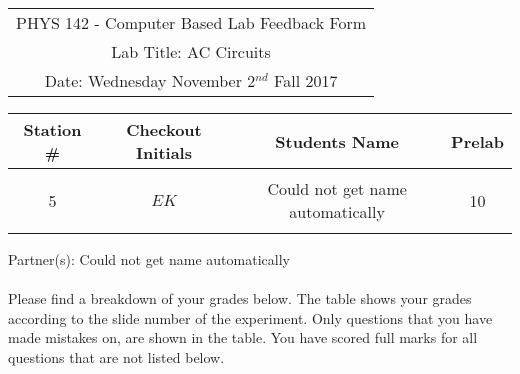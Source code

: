 \documentclass{article}
\begin{document}
\begin{table}[h]
	\centering
	\begin{tabular}{c}
	PHYS 142 - Computer Based Lab Feedback Form\\
	Lab Title: AC Circuits\\Date: Wednesday November 2$^{nd}$ Fall 2017 \\\hline
\end{tabular}
\end{table}
\begin{table}[h]\centering \begin{tabular}{|c|c|p{9.9 cm}|c|}\hline Station \#  & Checkout Initials & \multicolumn{1}{|c|}{Students Name} & Prelab \\\hline\multirow{3}{*}{5}& \multirow{3}{*}{$EK$} & &\\& &\multicolumn{1}{|c|}{Could not get name automatically}&10\\&   &  &\\\hline
\end{tabular}
\end{table}
Partner(s): Could not get name automatically\\
\\Please find a breakdown of your grades below. The table shows your grades according to the slide number of the experiment. Only questions that you have made mistakes on, are shown in the table. You have scored full marks for all questions that are not listed below.
\end{document}

